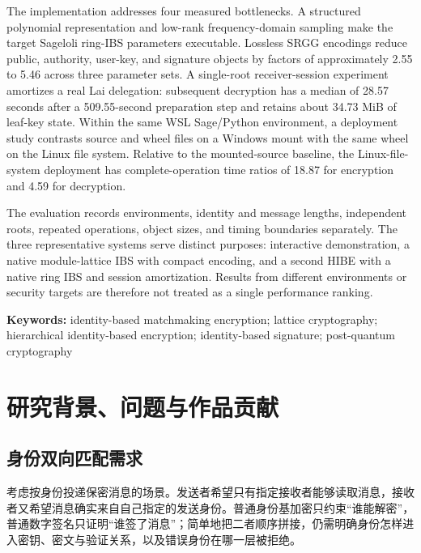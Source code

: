\documentclass[UTF8,a4paper,12pt,oneside,openany,fontset=fandol]{ctexrep}
\newcommand{\reportheader}{全国密码技术竞赛作品设计报告}
\renewcommand{\headrulewidth}{0pt}
\renewcommand{\footrulewidth}{0pt}
\renewcommand{\headrulewidth}{0.4pt}
\renewcommand{\footrulewidth}{0pt}
\begin{document}
The implementation addresses four measured bottlenecks. A structured polynomial representation and low-rank frequency-domain sampling make the target Sageloli ring-IBS parameters executable. Lossless SRGG encodings reduce public, authority, user-key, and signature objects by factors of approximately 2.55 to 5.46 across three parameter sets. A single-root receiver-session experiment amortizes a real Lai delegation: subsequent decryption has a median of 28.57 seconds after a 509.55-second preparation step and retains about 34.73 MiB of leaf-key state. Within the same WSL Sage/Python environment, a deployment study contrasts source and wheel files on a Windows mount with the same wheel on the Linux file system. Relative to the mounted-source baseline, the Linux-file-system deployment has complete-operation time ratios of 18.87 for encryption and 4.59 for decryption.

The evaluation records environments, identity and message lengths, independent roots, repeated operations, object sizes, and timing boundaries separately. The three representative systems serve distinct purposes: interactive demonstration, a native module-lattice IBS with compact encoding, and a second HIBE with a native ring IBS and session amortization. Results from different environments or security targets are therefore not treated as a single performance ranking.

\raggedright\noindent\textbf{Keywords:} identity-based matchmaking encryption; lattice cryptography; hierarchical identity-based encryption; identity-based signature; post-quantum cryptography
\par\endgroup

\clearpage
\tableofcontents
\clearpage
{}
\fancypagestyle{plain}{
  \fancyhf{}
  \fancyhead[C]{\small\songti\reportheader}
  \fancyfoot[C]{\small\thepage}
  \renewcommand{\headrulewidth}{0.4pt}
  \renewcommand{\footrulewidth}{0pt}
}
\pagestyle{mainmatter}

\chapter{研究背景、问题与作品贡献}

\section{身份双向匹配需求}
考虑按身份投递保密消息的场景。发送者希望只有指定接收者能够读取消息，接收者又希望消息确实来自自己指定的发送身份。普通身份基加密只约束“谁能解密”，普通数字签名只证明“谁签了消息”；简单地把二者顺序拼接，仍需明确身份怎样进入密钥、密文与验证关系，以及错误身份在哪一层被拒绝。
\end{document}
